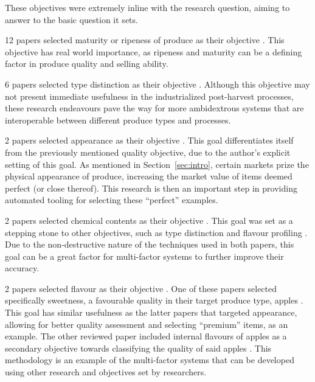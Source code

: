 \documentclass[conference]{IEEEtran}
\begin{document}
These objectives were extremely inline with the research question, aiming to answer to the basic question it sets.

12 papers selected maturity or ripeness of produce as their objective \cite{Hamza2018-sc} \cite{Pise2018} \cite{GarillosManliguez2021} \cite{Mohtar2019-ru} \cite{Saragih2021-wu} \cite{Mishra2022-kz} \cite{Castro2019-hk} \cite{Tamayo-Monsalve2022-ud} \cite{Prabhu2022-zh} \cite{Fadchar2020-pp} \cite{MiraeiAshtiani2021} \cite{Bhole2020}. This objective has real world importance, as ripeness and maturity can be a defining factor in produce quality and selling ability.

6 papers selected type distinction as their objective \cite{Geng2021} \cite{Zeb2022} \cite{Basri2018} \cite{Kumar2021} \cite{Pande2019-fz} \cite{Al_Haque2021-fw}. Although this objective may not present immediate usefulness in the industrialized post-harvest processes, these research endeavours pave the way for more ambidextrous systems that are interoperable between different produce types and processes.

2 papers selected appearance as their objective \cite{Choi2018-xp} \cite{Bautista2020-ye}. This goal differentiates itself from the previously mentioned quality objective, due to the author's explicit setting of this goal. As mentioned in Section~\ref{sec:intro}, certain markets prize the physical appearance of produce, increasing the market value of items deemed perfect (or close thereof). This research is then an important step in providing automated tooling for selecting these ``perfect'' examples.

2 papers selected chemical contents as their objective \cite{Lu2018} \cite{Rangel2021}. This goal was set as a stepping stone to other objectives, such as type distinction \cite{Rangel2021} and flavour profiling \cite{Lu2018}. Due to the non-destructive nature of the techniques used in both papers, this goal can be a great factor for multi-factor systems to further improve their accuracy.

2 papers selected flavour as their objective \cite{Choi2018-xp} \cite{Tran2021}. One of these papers selected specifically sweetness, a favourable quality in their target produce type, apples \cite{Tran2021}. This goal has similar usefulness as the latter papers that targeted appearance, allowing for better quality assessment and selecting ``premium'' items, as an example. The other reviewed paper included internal flavours of apples as a secondary objective towards classifying the quality of said apples \cite{Choi2018-xp}. This methodology is an example of the multi-factor systems that can be developed using other research and objectives set by researchers. 
\end{document}
